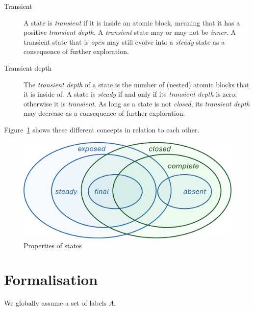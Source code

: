 \documentclass{article}
\begin{document}
\begin{description}
\item[Transient] A state is \emph{transient} if it is inside an atomic block, meaning that it has a positive \emph{transient depth}. A \emph{transient} state may or may not be \emph{inner}. A transient state that is \emph{open} may still evolve into a \emph{steady} state as a consequence of further exploration.

\item[Transient depth] The \emph{transient depth} of a state is the number of (nested) atomic blocks that it is inside of. A state is \emph{steady} if and only if its \emph{transient depth} is zero; otherwise it is \emph{transient}. As long as a state is not \emph{closed}, its \emph{transient depth} may decrease as a consequence of further exploration.
\end{description}

Figure~\ref{fig:venn} shows these different concepts in relation to each other.

\begin{figure}
\centering
\includegraphics[scale=.5]{figs/venn}
\caption{Properties of states}
\label{fig:venn}
\end{figure}

\section*{Formalisation}

\medskip\noindent
We globally assume a set of labels $A$.
\end{document}
